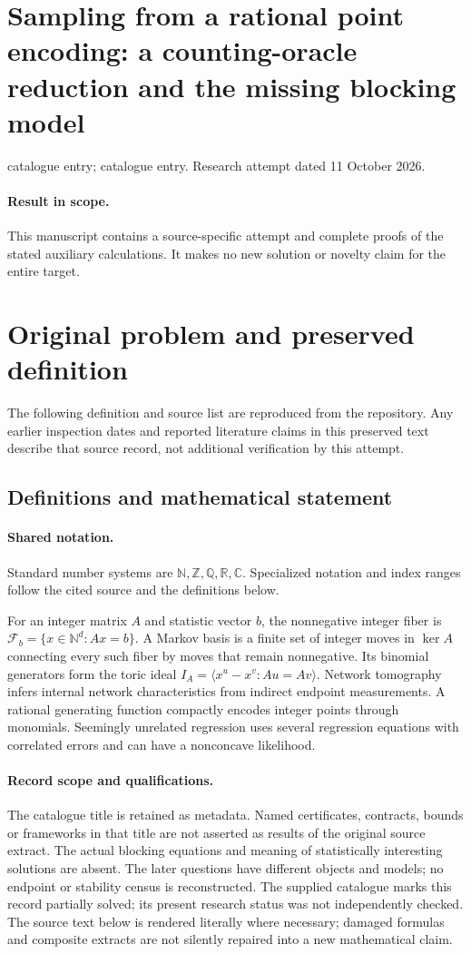 \documentclass[11pt]{article}
\begin{document}
\section*{Sampling from a rational point encoding: a counting-oracle reduction and the missing blocking model}
\noindent catalogue entry; catalogue entry. Research attempt dated 11 October 2026.
\paragraph{Result in scope.}This manuscript contains a source-specific attempt and complete proofs of the stated auxiliary calculations. It makes no new solution or novelty claim for the entire target.
\section{Original problem and preserved definition}
The following definition and source list are reproduced from the repository. Any earlier inspection dates and reported literature claims in this preserved text describe that source record, not additional verification by this attempt.
\subsection{Definitions and mathematical statement}

\paragraph{Shared notation.}Standard number systems are $\mathbb N,\mathbb Z,\mathbb Q,\mathbb R,\mathbb C$. Specialized notation and index ranges follow the cited source and the definitions below.


For an integer matrix $A$ and statistic vector $b$, the nonnegative integer fiber is $\mathcal F_b=\{x\in\mathbb N^d:Ax=b\}$. A Markov basis is a finite set of integer moves in $\ker A$ connecting every such fiber by moves that remain nonnegative. Its binomial generators form the toric ideal $I_A=\langle x^u-x^v:Au=Av\rangle$. Network tomography infers internal network characteristics from indirect endpoint measurements. A rational generating function compactly encodes integer points through monomials. Seemingly unrelated regression uses several regression equations with correlated errors and can have a nonconcave likelihood.
\paragraph{Record scope and qualifications.}
The catalogue title is retained as metadata. Named certificates, contracts, bounds or frameworks in that title are not asserted as results of the original source extract.
The actual blocking equations and meaning of statistically interesting solutions are absent. The later questions have different objects and models; no endpoint or stability census is reconstructed. The supplied catalogue marks this record partially solved; its present research status was not independently checked.
The source text below is rendered literally where necessary; damaged formulas and composite extracts are not silently repaired into a new mathematical claim.
\end{document}
